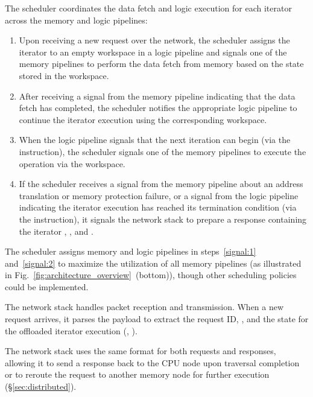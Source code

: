  The scheduler coordinates the data fetch and logic execution for each iterator across the memory and logic pipelines:
\begin{enumerate}[leftmargin=*, itemsep=0pt]
  \item Upon receiving a new request over the network, the scheduler assigns the iterator to an empty workspace in a logic pipeline and signals one of the memory pipelines to perform the data fetch from memory based on the state stored in the workspace.\label{signal:1}
  \item After receiving a signal from the memory pipeline indicating that the data fetch has completed, the scheduler notifies the appropriate logic pipeline to continue the iterator execution using the corresponding workspace.
  \item When the logic pipeline signals that the next iteration can begin (via the  instruction), the scheduler signals one of the memory pipelines to execute the  operation via the workspace.\label{signal:2}
  \item If the scheduler receives a signal from the memory pipeline about an address translation or memory protection failure, or a signal from the logic pipeline indicating the iterator execution has reached its termination condition (via the  instruction), it signals the network stack to prepare a response containing the iterator , , and .
\end{enumerate}
\noindent
The scheduler assigns memory and logic pipelines in steps~\ref{signal:1} and~\ref{signal:2} to maximize the utilization of all memory pipelines (as illustrated in Fig.~\ref{fig:architecture_overview}~(bottom)), though other scheduling policies could be implemented.

 The network stack handles packet reception and transmission. When a new request arrives, it parses the payload to extract the request ID, , and the state for the offloaded iterator execution (, ). 

The network stack uses the same format for both requests and responses, allowing it to send a response back to the CPU node upon traversal completion or to reroute the request to another memory node for further execution (\S\ref{sec:distributed}).



